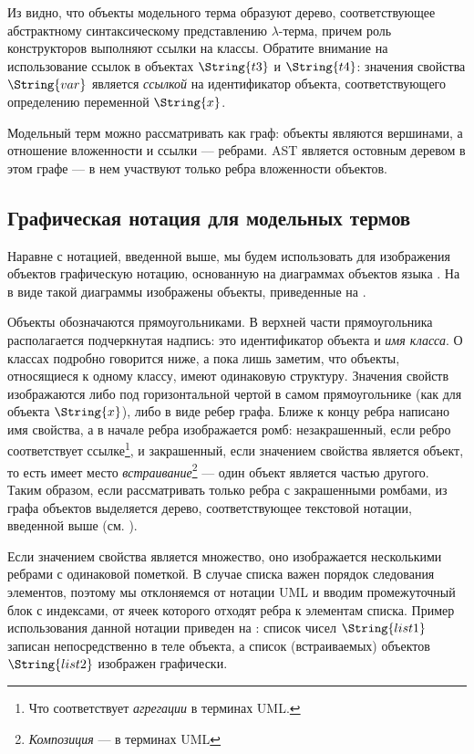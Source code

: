 Из  видно, что объекты модельного терма образуют дерево, соответствующее абстрактному синтаксическому представлению $\lambda$-терма, причем роль конструкторов выполняют ссылки на классы. Обратите внимание на использование ссылок в объектах $\String{t3}$ и $\String{t4}$: значения свойства $\String{var}$ является \emph{ссылкой} на идентификатор объекта, соответствующего определению переменной $\String{x}$. 

Модельный терм можно рассматривать как граф: объекты являются вершинами, а отношение вложенности и ссылки --- ребрами. AST является остовным деревом в этом графе --- в нем участвуют только ребра вложенности объектов.

\subsection{Графическая нотация для модельных термов}

Наравне с нотацией, введенной выше, мы будем использовать для изображения объектов графическую нотацию, основанную на диаграммах объектов языка  \cite{UML}. На  в виде такой диаграммы изображены объекты, приведенные на .


Объекты обозначаются прямоугольниками. В верхней части прямоугольника располагается подчеркнутая надпись: это идентификатор объекта и \emph{имя класса}. О классах подробно говорится ниже, а пока лишь заметим, что объекты, относящиеся к одному классу, имеют одинаковую структуру. Значения свойств изображаются либо под горизонтальной чертой в самом прямоугольнике (как для объекта $\String{x}$), либо в виде ребер графа. Ближе к концу ребра написано имя свойства, а в начале ребра изображается ромб: незакрашенный, если ребро соответствует ссылке\footnote{Что соответствует \emph{агрегации} в терминах UML.}, и закрашенный, если значением свойства является объект, то есть имеет место \emph{встраивание}\footnote{\emph{Композиция} --- в терминах UML} --- один объект является частью другого. Таким образом, если рассматривать только ребра с закрашенными ромбами, из графа объектов выделяется дерево, соответствующее текстовой нотации, введенной выше (см. ).


Если значением свойства является множество, оно изображается несколькими ребрами с одинаковой пометкой. В случае списка важен порядок следования элементов, поэтому мы отклоняемся от нотации UML и вводим промежуточный блок с индексами, от ячеек которого отходят ребра к элементам списка. Пример использования данной нотации приведен на : список чисел $\String{list1}$ записан непосредственно в теле объекта, а список (встраиваемых) объектов $\String{list2}$ изображен графически.

